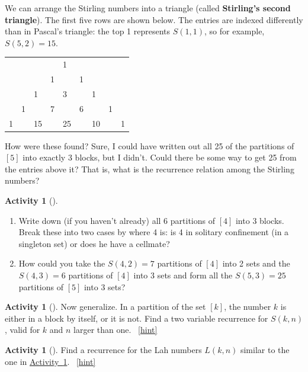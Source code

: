 \documentclass[10pt,]{book}
\newcommand{\terminology}[1]{\textbf{#1}}
\theoremstyle{plain}
\theoremstyle{definition}
\theoremstyle{definition}
\theoremstyle{definition}
\newtheorem{activity}[project]{Activity}
\numberwithin{equation}{chapter}
\begin{document}
\hypertarget{p-667}{}%
We can arrange the Stirling numbers into a triangle (called \terminology{Stirling's second triangle}).  The first five rows are shown below.  The entries are indexed differently than in Pascal's triangle: the top 1 represents \(S(1,1)\), so for example, \(S(5,2) = 15\).%
\begin{sidebyside}{1}{0.25}{0.25}{0}
\begin{sbspanel}{0.5}
{\centering%
\begin{tabular}{lllllllll}
&&&&1&&&&\tabularnewline[0pt]
&&&1&&1&&&\tabularnewline[0pt]
&&1&&3&&1&&\tabularnewline[0pt]
&1&&7&&6&&1&\tabularnewline[0pt]
1&&15&&25&&10&&1
\end{tabular}
\par}
\end{sbspanel}
\end{sidebyside}
\par
\hypertarget{p-668}{}%
How were these found?  Sure, I could have written out all 25 of the partitions of \([5]\) into exactly \(3\) blocks, but I didn't.  Could there be some way to get 25 from the entries above it?  That is, what is the recurrence relation among the Stirling numbers?%
\begin{activity}[]\label{activity-137}
\leavevmode%
\begin{enumerate}[font=\bfseries,label=(\alph*),ref=\alph*]
\item\label{task-142} \hypertarget{p-669}{}%
Write down (if you haven't already) all 6 partitions of \([4]\) into \(3\) blocks.  Break these into two cases by where 4 is: is 4 in solitary confinement (in a singleton set) or does he have a cellmate?%
\item\label{task-143} \hypertarget{p-670}{}%
How could you take the \(S(4,2) = 7\) partitions of \([4]\) into 2 sets and the \(S(4,3) = 6\) partitions of \([4]\) into 3 sets and form all the \(S(5,3) = 25\) partitions of \([5]\) into \(3\) sets?%
\end{enumerate}
\end{activity}
\begin{activity}[]\label{secondstirlingrecurrence}
\hypertarget{p-671}{}%
Now generalize.  In a partition of the set \([k]\), the number \(k\) is either in a block by itself, or it is not.  Find a two variable recurrence for \(S(k,n)\), valid for \(k\) and \(n\) larger than one.%
~\hfill{\tiny\hyperlink{a-138}{[hint]}\hypertarget{q-138}{}}\end{activity}
\begin{activity}[]\label{activity-139}
\hypertarget{p-674}{}%
Find a recurrence for the Lah numbers \(L(k,n)\) similar to the one in \hyperref[secondstirlingrecurrence]{Activity~\ref{secondstirlingrecurrence}}.%
~\hfill{\tiny\hyperlink{a-139}{[hint]}\hypertarget{q-139}{}}\end{activity}
\end{document}
